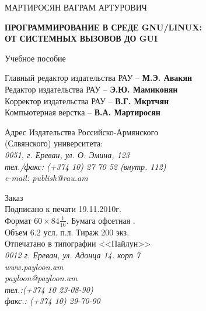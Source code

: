 
\setmainfont{Free Serif}  

\thispagestyle{empty}
\fontsize{15}{15}
\begin{center}
{\large
\bigskip
МАРТИРОСЯН ВАГРАМ АРТУРОВИЧ

\vskip 70pt

{\bf ПРОГРАММИРОВАНИЕ В СРЕДЕ GNU/LINUX:\\
ОТ СИСТЕМНЫХ ВЫЗОВОВ ДО GUI}

\vskip 70pt

Учебное пособие
}
\vskip 70pt
{\large
Главный редактор издательства РАУ -- {\bf М.Э. Авакян }\\
Редактор издательства РАУ -- {\bf Э.Ю. Мамиконян }\\
Корректор издательства РАУ -- {\bf В.Г. Мкртчян }\\
Компьютерная верстка -- {\bf В.А. Мартиросян }\\
}
\bigskip
\bigskip
\bigskip

\linespread{1.0}\normalsize

{\normalsize
Адрес Издательства Российско-Армянского \\(Слвянского) университета: \\
{\em   0051, г. Ереван, ул. О. Эмина, 123 \\
тел./факс: (+374 10) 27 70 52 (внутр. 112) \\
e-mail: publish@rau.am } }


\bigskip
\bigskip
\bigskip



{\normalsize Заказ  \\
Подписано к печати 19.11.2010г. \\
Формат $ 60 \times 84 {\frac 1 {16}} $. Бумага офсетная .\\
Объем 6.2 усл. п.л. Тираж 200 экз.\\
Отпечатано в типографии <<Пайлун>> \\
{\em 0012 г. Ереван, ул. Адонца 14. корп 7 \\
www.payloon.am \\
payloon@payloon.am \\
тел.:(+374 10 23-08-90) \\
факс.: (+374 10) 29-70-90 } }



\end{center}
